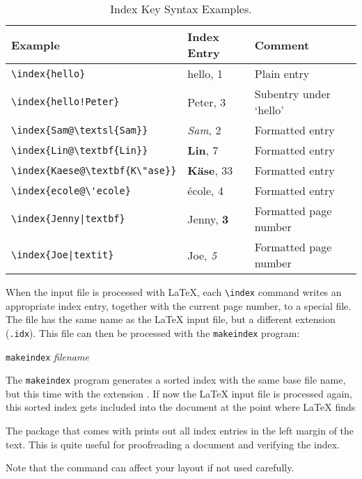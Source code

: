 \begin{table}[!tp]
  \centering
\caption{Index Key Syntax Examples.}
\label{index}
\begin{tabular}{@{}lll@{}}
  \toprule
  Example &Index Entry &Comment\\\midrule
  \rule{0pt}{1.05em}\verb|\index{hello}| &hello, 1 &Plain entry\\
\verb|\index{hello!Peter}|   &\hspace*{2ex}Peter, 3 &Subentry under `hello'\\
\verb|\index{Sam@\textsl{Sam}}|     &\textsl{Sam}, 2& Formatted entry\\
\verb|\index{Lin@\textbf{Lin}}|     &\textbf{Lin}, 7& Formatted entry\\
\verb|\index{Kaese@\textbf{K\"ase}}|     &\textbf{K\"ase}, 33& Formatted entry\\
\verb.\index{ecole@\'ecole}.     &\'ecole, 4& Formatted entry\\
\verb.\index{Jenny|textbf}.     &Jenny, \textbf{3}& Formatted page number\\
\verb.\index{Joe|textit}.     &Joe, \textit{5}& Formatted page number\\
\bottomrule
\end{tabular}
\end{table}

When the input file is processed with \LaTeX{}, each \verb|\index|
command writes an appropriate index entry, together with the current
page number, to a special file. The file has the same name as the
\LaTeX{} input file, but a different extension (\verb|.idx|). This
 file can then be processed with the \texttt{makeindex}
program:

\begin{lscommand}
  \texttt{makeindex} \emph{filename}
\end{lscommand}
The \texttt{makeindex} program generates a sorted index with the same base
file name, but this time with the extension . If now the
\LaTeX{} input file is processed again, this sorted index gets
included into the document at the point where \LaTeX{} finds
\begin{lscommand}
\end{lscommand}

The  package that comes with \LaTeXe{} prints out all
index entries in the left margin of the text. This is quite useful for
proofreading a document and verifying the index.

Note that the  command can affect your layout if not used carefully.

